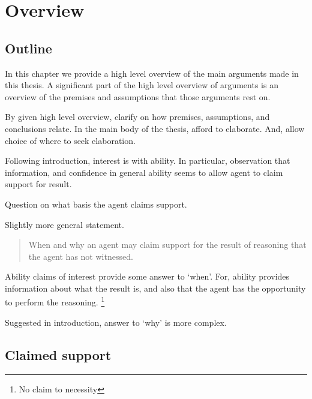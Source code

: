 \chapter{Overview}
\label{cha:overview}

\section{Outline}
\label{sec:outline}

\begin{note}
  In this chapter we provide a high level overview of the main arguments made in this thesis.
  A significant part of the high level overview of arguments is an overview of the premises and assumptions that those arguments rest on.

  By given high level overview, clarify on how premises, assumptions, and conclusions relate.
  In the main body of the thesis, afford to elaborate.
  And, allow choice of where to seek elaboration.
\end{note}

\begin{note}
  Following introduction, interest is with ability.
  In particular, observation that \gsi{} information, and confidence in general ability seems to allow agent to claim support for result.

  Question on what basis the agent claims support.

  Slightly more general statement.
  \begin{quote}
    When and why an agent may claim support for the result of reasoning that the agent has not witnessed.
  \end{quote}
  Ability claims of interest provide some answer to `when'.
  For, ability provides information about what the result is, and also that the agent has the opportunity to perform the reasoning.\nolinebreak
  \footnote{No claim to necessity}

  Suggested in introduction, answer to `why' is more complex.
\end{note}

\section{Claimed support}
\label{sec:abil-access-supp}


